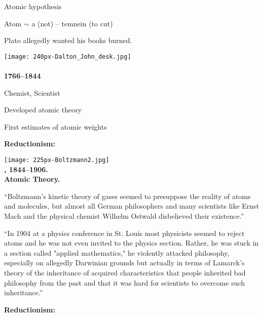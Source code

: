 \begin{frame}[plain]
     
      Atomic hypothesis
     
      Atom $\sim$ a (not) -- temnein (to cut)
     
      Plato allegedly wanted his books burned.
    
    
  
  \medskip

      
    \texttt{[image: 240px-Dalton\_John\_desk.jpg]}\\
    
    \textbf{
        \\
        1766--1844
      }
      
     
      Chemist, Scientist
     
      Developed atomic theory
     
      First estimates of atomic weights
    
    
  

  \textbf{Reductionism:}

      
    \texttt{[image: 225px-Boltzmann2.jpg]}\\
    
    \textbf{
        , 1844--1906.\\
        Atomic Theory.
      }
      
      
        \small
        ``Boltzmann's kinetic theory of gases seemed to presuppose the
        reality of atoms and molecules, but almost all German philosophers and
        many scientists like Ernst Mach and the physical chemist Wilhelm
        Ostwald disbelieved their existence.''
      
    
  
  
    
     
      \small
      ``In 1904 at a physics conference in St. Louis most
      physicists seemed to reject atoms and he was not even invited
      to the physics section. Rather, he was stuck in a section
      called "applied mathematics," he violently attacked
      philosophy, especially on allegedly Darwinian grounds but
      actually in terms of Lamarck's theory of the inheritance of
      acquired characteristics that people inherited bad philosophy
      from the past and that it was hard for scientists to overcome
      such inheritance.''
    
  


  \textbf{Reductionism:}


\end{frame}
